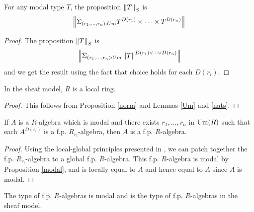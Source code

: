     \begin{proposition}\label{norm}
      For any modal type $T$, the proposition $\left\lVert T \right\rVert_S$ is
      $$\left\lVert \Sigma_{(r_1,\dots,r_n):Um}T^{D(r_1)}\times\dots\times T^{D(r_n)} \right\rVert$$
    \end{proposition}
    
    \begin{proof}
      The proposition $\left\lVert T \right\rVert_S$ is
      $$\left\lVert \Sigma_{(r_1,\dots,r_n):Um}\left\lVert T \right\rVert^{D(r_1)\vee\dots\vee D(r_n)} \right\rVert$$
      and we get the result using the fact that choice holds for each $D(r_i)$.
    \end{proof}
    
    \begin{proposition}
      In the sheaf model, $R$ is a local ring.
    \end{proposition}

    \begin{proof}
      This follows from Proposition \ref{norm} and Lemmas \ref{Um} and \ref{nats}.
    \end{proof}

    \begin{lemma}\label{localfp}
      If $A$ is a $R$-algebra which is modal and there exists $r_1,\dots,r_n$ in $\mathrm{Um}(R)$ such that each
      $A^{D(r_i)}$ is a f.p. $R_{r_i}$-algebra, then $A$ is a f.p. $R$-algebra.
    \end{lemma}
    
    \begin{proof}
      Using the local-global principles presented in \cite{lombardi-quitte}, we can patch together the f.p. $R_{r_i}$-algebra
      to a global f.p. $R$-algebra. This f.p. $R$-algebra is modal by Proposition \ref{modal}, and is locally equal to $A$
      and hence equal to $A$ since $A$ is modal.
    \end{proof}

    \begin{corollary}
      The type of f.p. $R$-algebras is modal and is the type of f.p. $R$-algebras in the sheaf model.
    \end{corollary}

